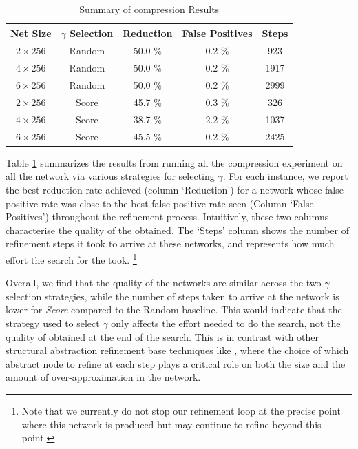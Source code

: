 \begin{table}
\centering
\begin{tabular}{|c|c|c|c|c|}
\hline
Net Size     & $\gamma$ Selection & Reduction & False Positives & Steps  \\ 
\hline
$2\times256$ & Random             & 50.0 \%   & 0.2  \%         &  923   \\  
$4\times256$ & Random             & 50.0 \%   & 0.2  \%         & 1917    \\ 
$6\times256$ & Random             & 50.0 \%   & 0.2  \%         & 2999    \\ 
$2\times256$ & Score      & 45.7 \%   & 0.3  \%         &  326    \\ 
$4\times256$ & Score      & 38.7 \%   & 2.2  \%         & 1037    \\ 
$6\times256$ & Score      & 45.5 \%   & 0.2  \%         & 2425    \\ 
\hline
\end{tabular}
\caption{Summary of \mnist compression Results}
\label{t:mnist-compr-summary}
\vspace{-1cm}
\end{table}

Table \ref{t:mnist-compr-summary} summarizes the results from running all the
compression experiment on all the \mnist network via various strategies for
selecting $\gamma$. For each instance, we report the best reduction
rate achieved (column `Reduction') for a network whose false positive rate was
close to the best false positive rate seen (Column `False Positives')
throughout the refinement process. Intuitively, these two columns characterise
the quality of the \abs obtained. The `Steps' column shows the
number of refinement steps it took to arrive at these networks, and represents
how much effort the search for the \abs took. \footnote{ Note that we currently do
not stop our refinement loop at the precise point where this network is produced
but may continue to refine beyond this point. }

Overall, we find that the quality of the networks are similar across the two
$\gamma$ selection strategies, while the number of steps
taken to arrive at the network is lower for \emph{Score} compared to the Random
baseline. This would indicate that the strategy used to select $\gamma$ only
affects the effort needed to do the search, not the quality of \abs obtained at
the end of the search. This is in contrast with other structural abstraction
refinement base techniques like \cite{cegar-nn,cegarette,cleverest-nn}, where
the choice of which abstract node to refine at each step plays a critical role
on both the size and the amount of over-approximation in the network. 

